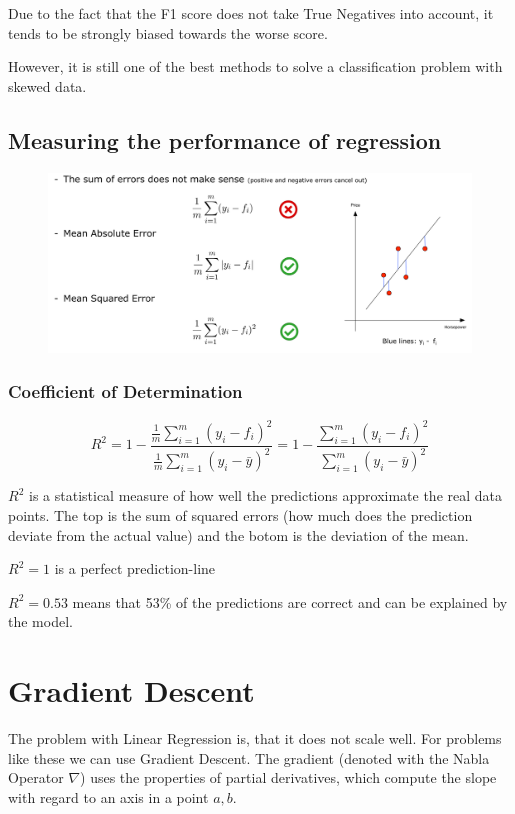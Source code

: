 \documentclass[11pt]{article}
\begin{document}
Due to the fact that the F1 score does not take True Negatives into account, it tends to be strongly biased towards the worse score.

However, it is still one of the best methods to solve a classification problem with skewed data.


\subsection{Measuring the performance of regression}

\begin{figure}[htb]
    \centering
    \includegraphics[keepaspectratio=true, width=\linewidth]{regression_error.png}
    \label{fig:regression_error}
\end{figure}

\subsubsection{Coefficient of Determination} \label{sec:r_squared}

\begin{equation}
    R^2 = 1- \frac{\frac{1}{m} \sum^{m}_{i=1}(y_{i} - f_{i})^2}{\frac{1}{m} \sum^{m}_{i=1}(y_{i} - \bar{y})^2} =1 - \frac{\sum^{m}_{i=1}(y_{i} - f_{i})^2}{\sum^{m}_{i=1}(y_{i} - \bar{y})^2}
\end{equation}

$R^2$ is a statistical measure of how well the predictions approximate the real data points.
The top is the sum of squared errors (how much does the prediction deviate from the actual value) and the botom is the deviation of the mean.

$R^2 = 1$ is a perfect prediction-line

$R^2 = 0.53$ means that 53\% of the predictions are correct and can be explained by the model.

\newpage

\section{Gradient Descent}
The problem with Linear Regression is, that it does not scale well. For problems like these we can use Gradient Descent. The gradient (denoted with the Nabla Operator $\nabla$) uses the properties of partial derivatives, which compute the slope with regard to an axis in a point $a,b$.
\end{document}

